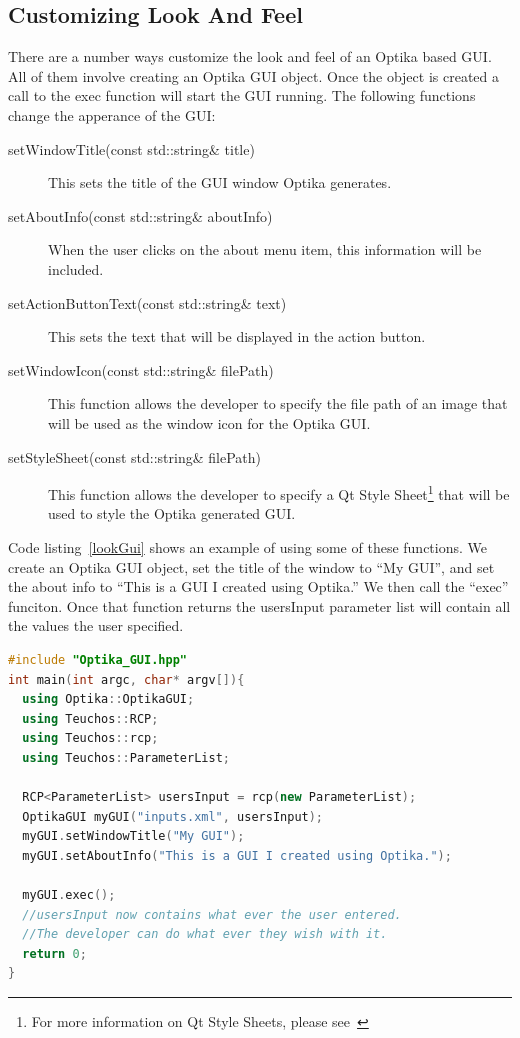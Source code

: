\subsection{Customizing Look And Feel}
There are a number ways customize the look and feel of an Optika based GUI. All of them involve creating an Optika GUI object. Once the object is created a call to the
exec function will start the GUI running. The following functions change the apperance of the GUI:
\begin{description}
\item[setWindowTitle(const std::string\& title)] This sets the title of the GUI window Optika generates.
\item[setAboutInfo(const std::string\& aboutInfo)] When the user clicks on the about menu item, this information will be included.
\item[setActionButtonText(const std::string\& text)] This sets the text that will be displayed in the action button.
\item[setWindowIcon(const std::string\& filePath)] This function allows the developer to specify the file path of an image that will be used as the window icon for the 
Optika GUI.
\item[setStyleSheet(const std::string\& filePath)] This function allows the developer to specify a Qt Style Sheet\footnote{For more information on Qt Style Sheets, please 
see~\cite{QtStyle}} that will be used to style the Optika generated GUI.
\end{description}

Code listing~\ref{lookGui} shows an example of using some of these functions. We create an Optika GUI object, set the title of the window to ``My GUI'', and set the
about info to ``This is a GUI I created using Optika.'' We then call the ``exec'' funciton. Once that function returns the usersInput parameter list will contain all the values
the user specified.
\begin{lstlisting}[language=C++, caption={Example of customizing the look and feel of an Optika GUI}, label=lookGui]
#include "Optika_GUI.hpp"
int main(int argc, char* argv[]){
  using Optika::OptikaGUI;
  using Teuchos::RCP;
  using Teuchos::rcp;
  using Teuchos::ParameterList;

  RCP<ParameterList> usersInput = rcp(new ParameterList);
  OptikaGUI myGUI("inputs.xml", usersInput);
  myGUI.setWindowTitle("My GUI");
  myGUI.setAboutInfo("This is a GUI I created using Optika.");

  myGUI.exec();
  //usersInput now contains what ever the user entered.
  //The developer can do what ever they wish with it.
  return 0;
}
\end{lstlisting}

